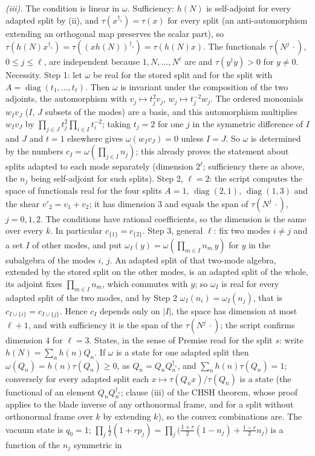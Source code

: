 \emph{(iii).} The condition is linear in $\omega$. Sufficiency: $h(N)$ is self-adjoint for every adapted split by (ii), and $\tau(x^{\dagger_{s}}) = \tau(x)$ for every split (an anti-automorphism extending an orthogonal map preserves the scalar part), so $\tau(h(N)x^{\dagger_{s}}) = \tau((xh(N))^{\dagger_{s}}) = \tau(h(N)x)$. The functionals $\tau(N^{j}\,\cdot)$, $0 \le j \le \ell$, are independent because $1, N, \dots, N^{\ell}$ are and $\tau(y^{\dagger}y) > 0$ for $y \ne 0$. Necessity. Step 1: let $\omega$ be real for the stored split and for the split with $A = \operatorname{diag}(t_{1}, \dots, t_{\ell})$. Then $\omega$ is invariant under the composition of the two adjoints, the automorphism with $v_{j} \mapsto t_{j}^{2}v_{j}$, $w_{j} \mapsto t_{j}^{-2}w_{j}$. The ordered monomials $w_{I}v_{J}$ ($I$, $J$ subsets of the modes) are a basis, and this automorphism multiplies $w_{I}v_{J}$ by $\prod_{j \in J}t_{j}^{2}\prod_{i \in I}t_{i}^{-2}$; taking $t_{j} = 2$ for one $j$ in the symmetric difference of $I$ and $J$ and $t = 1$ elsewhere gives $\omega(w_{I}v_{J}) = 0$ unless $I = J$. So $\omega$ is determined by the numbers $c_{I} = \omega(\prod_{j \in I}n_{j})$; this already proves the statement about splits adapted to each mode separately (dimension $2^{\ell}$; sufficiency there as above, the $n_{j}$ being self-adjoint for such splits). Step 2, $\ell = 2$: the script computes the space of functionals real for the four splits $A = 1$, $\operatorname{diag}(2,1)$, $\operatorname{diag}(1,3)$ and the shear $v'_{2} = v_{1} + v_{2}$; it has dimension $3$ and equals the span of $\tau(N^{j}\,\cdot)$, $j = 0, 1, 2$. The conditions have rational coefficients, so the dimension is the same over every $k$. In particular $c_{\{1\}} = c_{\{2\}}$. Step 3, general $\ell$: fix two modes $i \ne j$ and a set $I$ of other modes, and put $\omega_{I}(y) = \omega(\prod_{m \in I}n_{m}\,y)$ for $y$ in the subalgebra of the modes $i$, $j$. An adapted split of that two-mode algebra, extended by the stored split on the other modes, is an adapted split of the whole, its adjoint fixes $\prod_{m \in I}n_{m}$, which commutes with $y$; so $\omega_{I}$ is real for every adapted split of the two modes, and by Step 2 $\omega_{I}(n_{i}) = \omega_{I}(n_{j})$, that is $c_{I \cup \{i\}} = c_{I \cup \{j\}}$. Hence $c_{I}$ depends only on $|I|$, the space has dimension at most $\ell + 1$, and with sufficiency it is the span of the $\tau(N^{j}\,\cdot)$; the script confirms dimension $4$ for $\ell = 3$. States, in the sense of Premise  read for the split $s$: write $h(N) = \sum_{n}h(n)Q_{n}$. If $\omega$ is a state for one adapted split then $\omega(Q_{n}) = h(n)\tau(Q_{n}) \ge 0$, as $Q_{n} = Q_{n}Q_{n}^{\dagger_{s}}$, and $\sum_{n}h(n)\tau(Q_{n}) = 1$; conversely for every adapted split each $x \mapsto \tau(Q_{n}x)/\tau(Q_{n})$ is a state (the functional of an element $Q_{n}Q_{n}^{\dagger_{s}}$; clause (iii) of the CHSH theorem, whose proof applies to the blade inverse of any orthonormal frame, and for a split without orthonormal frame over $k$ by extending $k$), so the convex combinations are. The vacuum state is $q_{0} = 1$; $\prod_{j}\tfrac12(1 + rp_{j}) = \prod_{j}\bigl(\tfrac{1+r}{2}(1 - n_{j}) + \tfrac{1-r}{2}n_{j}\bigr)$ is a function of the $n_{j}$ symmetric in 